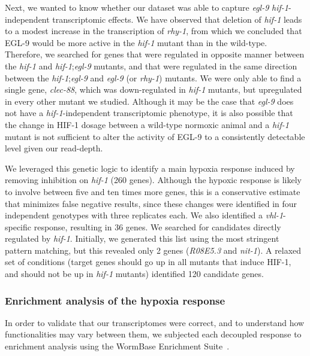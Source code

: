 \documentclass[9pt,twocolumn,twoside]{pnas-new}
\newcommand{\egl}{\emph{egl-9}}
\newcommand{\rhy}{\emph{rhy-1}}
\newcommand{\vhl}{\emph{vhl-1}}
\newcommand{\hif}{\emph{hif-1}}
\newcommand{\eglp}{EGL-9}
\newcommand{\hifp}{HIF-1}
\newcommand{\vhltargets}{36}
\newcommand{\hiftargets}{120}
\begin{document}
Next, we wanted to know whether our dataset was able to capture \egl{}
\hif{}-independent transcriptomic effects. We have observed that deletion of
\hif{} leads to a modest increase in the transcription of \rhy{}, from which we
concluded that \eglp{} would be more active in the \hif{} mutant than in the
wild-type. Therefore, we searched for genes that were regulated in opposite
manner between the \hif{} and \hif{};\egl{} mutants, and that were regulated
in the same direction between the \hif{};\egl{} and \egl{} (or \rhy{}) mutants.
We were only able to find a single gene, \emph{clec-88}, which was down-regulated
in \hif{} mutants, but upregulated in every other mutant we studied. Although
it may be the case that \egl{} does not have a \hif{}-independent transcriptomic
phenotype, it is also possible that the change in \hifp{} dosage between a
wild-type normoxic animal and a \hif{} mutant is not sufficient to alter the
activity of \eglp{} to a consistently detectable level given our read-depth.

We leveraged this genetic logic to identify a main hypoxia
response induced by removing inhibition on \hif{} (260 genes). Although the
hypoxic response is likely to involve between five and ten times more genes,
this is a conservative estimate that minimizes false negative results, since
these changes were identified in four independent genotypes with three replicates
each. We also identified a \vhl{}-specific response, resulting in \vhltargets{}
genes. We searched for candidates directly regulated by \hif{}.
Initially, we generated this list using the most stringent pattern
matching, but this revealed only 2 genes (\emph{R08E5.3} and
\emph{nit-1}). A relaxed set of conditions (target genes should go up in all
mutants that induce \hifp{}, and should not be up in \hif{} mutants) identified
\hiftargets{} candidate genes.

\subsubsection*{Enrichment analysis of the hypoxia response}
\label{sub:ea_hypoxia}
In order to validate that our transcriptomes were correct, and to understand how
functionalities may vary between them, we subjected each decoupled response to
enrichment analysis using the WormBase Enrichment
Suite~\cite{Angeles-Albores2016}.
\end{document}
